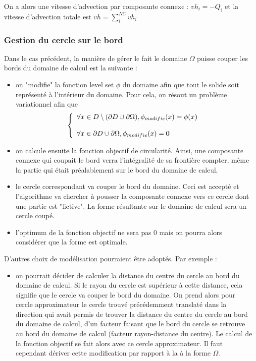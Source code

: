 \documentclass[11pt,a4paper]{article}
\begin{document}
On a alors une vitesse d'advection par composante connexe : $vh_i=-Q_i$ et la vitesse d'advection totale est $vh=\sum_i^{NC}vh_i$


\subsubsection{Gestion du cercle sur le bord}
Dans le cas précédent, la manière de gérer le fait le domaine $\Omega$ puisse couper les bords du domaine de calcul est la suivante :
\begin{itemize}
	\item on "modifie" la fonction level set $\phi$ du domaine afin que tout le solide soit représenté à l'intérieur du domaine. Pour cela, on résout un problème variationnel afin que 
	\begin{equation}
	\left\{\begin{array}{l}
		\forall x\in D \setminus (\partial D\cup\partial\Omega), \phi_{modifie}(x)=\phi(x) \\
		\\
		\forall x\in\partial D\cup\partial\Omega, \phi_{modifie}(x)=0
		\end{array}\right.
	\end{equation}
	
	\item on calcule ensuite la fonction objectif de circularité. Ainsi, une composante connexe qui coupait le bord verra l'intégralité de sa frontière compter, même la partie qui était préalablement sur le bord du domaine de calcul.
	\item le cercle correspondant va couper le bord du domaine. Ceci est accepté et l'algorithme va chercher à pousser la composante connexe vers ce cercle dont une partie est "fictive". La forme résultante sur le domaine de calcul sera un cercle coupé. 
	
	\item l'optimum de la fonction objectif ne sera pas 0 mais on pourra alors considérer que la forme est optimale.
\end{itemize}

D'autres choix de modélisation pourraient être adoptés. Par exemple :
\begin{itemize}
	\item on pourrait décider de calculer la distance du centre du cercle au bord du domaine de calcul. Si le rayon du cercle est supérieur à cette distance, cela signifie que le cercle va couper le bord du domaine. On prend alors pour cercle approximateur le cercle trouvé précédemment translaté dans la direction qui avait permis de trouver la distance du centre du cercle au bord du domaine de calcul, d'un facteur faisant que le bord du cercle se retrouve au bord du domaine de calcul (facteur rayon-distance du centre). Le calcul de la fonction objectif se fait alors avec ce cercle approximateur. Il faut cependant dériver cette modification par rapport à la à la forme $\Omega$.

\end{itemize}
\end{document}
